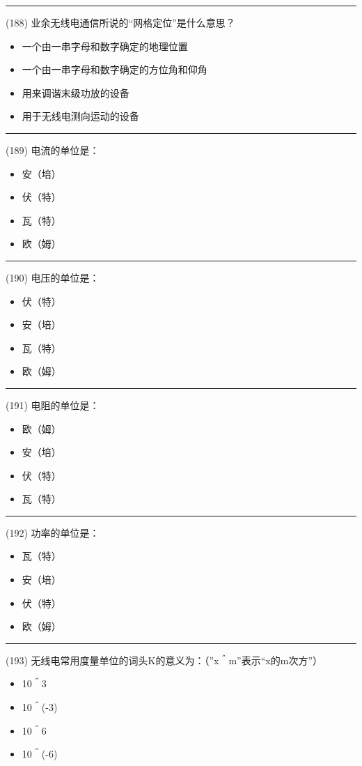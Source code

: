 \documentclass[twocolumn]{ctexart}  %
\begin{document}
\noindent\rule{0.5\textwidth}{1pt}
\heiti (188) 业余无线电通信所说的“网格定位”是什么意思？ \songti {\color{gray} [LK1208] }
\begin{itemize}
	\item  一个由一串字母和数字确定的地理位置
	\item  一个由一串字母和数字确定的方位角和仰角
	\item  用来调谐末级功放的设备
	\item  用于无线电测向运动的设备
\end{itemize}


\noindent\rule{0.5\textwidth}{1pt}
\heiti (189) 电流的单位是： \songti {\color{gray} [LK0431] }
\begin{itemize}
	\item  安（培）
	\item  伏（特）
	\item  瓦（特）
	\item  欧（姆）
\end{itemize}


\noindent\rule{0.5\textwidth}{1pt}
\heiti (190) 电压的单位是： \songti {\color{gray} [LK0432] }
\begin{itemize}
	\item  伏（特）
	\item  安（培）
	\item  瓦（特）
	\item  欧（姆）
\end{itemize}


\noindent\rule{0.5\textwidth}{1pt}
\heiti (191) 电阻的单位是： \songti {\color{gray} [LK0433] }
\begin{itemize}
	\item  欧（姆）
	\item  安（培）
	\item  伏（特）
	\item  瓦（特）
\end{itemize}


\noindent\rule{0.5\textwidth}{1pt}
\heiti (192) 功率的单位是： \songti {\color{gray} [LK0434] }
\begin{itemize}
	\item  瓦（特）
	\item  安（培）
	\item  伏（特）
	\item  欧（姆）
\end{itemize}


\noindent\rule{0.5\textwidth}{1pt}
\heiti (193) 无线电常用度量单位的词头K的意义为：（”x＾m”表示“x的m次方”） \songti {\color{gray} [LK0466] }
\begin{itemize}
	\item  10＾3
	\item  10＾(-3)
	\item  10＾6
	\item  10＾(-6)
\end{itemize}
\end{document}
